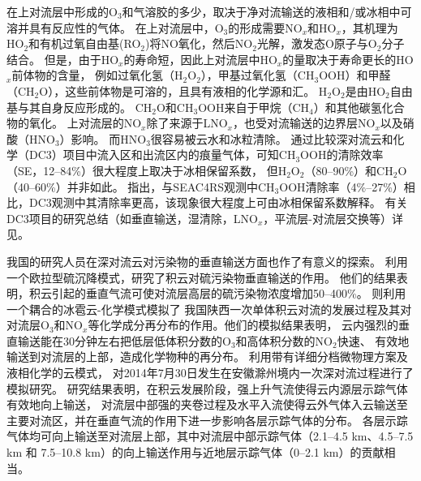 在上对流层中形成的O$_3$和气溶胶的多少，取决于净对流输送的液相和/或冰相中可溶并具有反应性的气体。
在上对流层中，O$_3$的形成需要NO$_x$和HO$_x$，其机理为HO$_2$和有机过氧自由基(RO$_2$)将NO氧化，然后NO$_2$光解，激发态O原子与O$_2$分子结合。
但是，由于HO$_x$的寿命短，因此上对流层中HO$_x$的量取决于寿命更长的HO$_x$前体物的含量，
例如过氧化氢（H$_2$O$_2$），甲基过氧化氢（CH$_3$OOH）和甲醛（CH$_2$O）\citep{Chatfield.1984,Prather.1997}，这些前体物是可溶的，且具有液相的化学源和汇\citep{Barth.2007,Carlton.2007}。
H$_2$O$_2$是由HO$_2$自由基与其自身反应形成的。 CH$_2$O和CH$_3$OOH来自于甲烷（CH$_4$）和其他碳氢化合物的氧化。
上对流层的NO$_x$除了来源于LNO$_x$，也受对流输送的边界层NO$_x$以及硝酸（HNO$_3$）影响\citep{Grassian.2005}。
而HNO$_3$很容易被云水和冰粒清除\citep{Neu.2012}。
通过比较深对流云和化学（DC3）项目中流入区和出流区内的痕量气体，可知CH$_3$OOH的清除效率（SE，12--84\%）很大程度上取决于冰相保留系数，
但H$_2$O$_2$（80--90\%）和CH$_2$O（40--60\%）并非如此\citep{Barth.2016,Bela.2016,Fried.2016}。
\citet{Cuchiara.2020}指出，与SEAC4RS观测中CH$_3$OOH清除率（4\%--27\%）相比，DC3观测中其清除率更高，该现象很大程度上可由冰相保留系数解释。
有关DC3项目的研究总结（如垂直输送，湿清除，LNO$_x$，平流层-对流层交换等）详见\citet{Barth.2019}。

我国的研究人员在深对流云对污染物的垂直输送方面也作了有意义的探索。
\citet{GaoHuiWang.1998}利用一个欧拉型硫沉降模式，研究了积云对硫污染物垂直输送的作用。
他们的结果表明，积云引起的垂直气流可使对流层高层的硫污染物浓度增加50--400\%。
\cite{LiBing.1999,LiBing.2001}则利用一个耦合的冰雹云-化学模式模拟了
我国陕西一次单体积云对流的发展过程及其对对流层O$_3$和NO$_x$等化学成分再分布的作用。他们的模拟结果表明，
云内强烈的垂直输送能在30分钟左右把低层低体积分数的O$_3$和高体积分数的NO$_2$快速、
有效地输送到对流层的上部，造成化学物种的再分布。
\citet{HuJiaYing.2019}利用带有详细分档微物理方案及液相化学的云模式，
对2014年7月30日发生在安徽滁州境内一次深对流过程进行了模拟研究。
研究结果表明，在积云发展阶段，强上升气流使得云内源层示踪气体有效地向上输送，
对流层中部强的夹卷过程及水平入流使得云外气体入云输送至主要对流区，并在垂直气流的作用下进一步影响各层示踪气体的分布。
各层示踪气体均可向上输送至对流层上部，其中对流层中部示踪气体（2.1--4.5 km、4.5--7.5 km 和 7.5--10.8 km）的向上输送作用与近地层示踪气体（0--2.1 km）的贡献相当。




